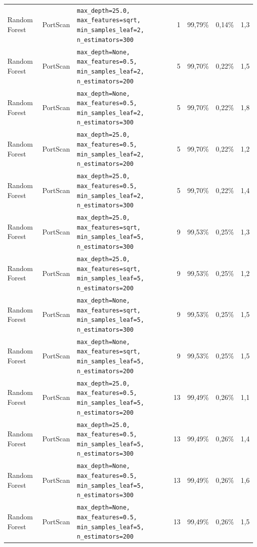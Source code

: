 {{\begin{tabularx}{\textwidth}{@{}llLrrrr@{}}
Random Forest & PortScan & \scriptsize\texttt{max\_depth=25.0, max\_features=sqrt, min\_samples\_leaf=2, n\_estimators=300} & 1 & 99,79\% & 0,14\% & 1,3\\
Random Forest & PortScan & \scriptsize\texttt{max\_depth=None, max\_features=0.5, min\_samples\_leaf=2, n\_estimators=200} & 5 & 99,70\% & 0,22\% & 1,5\\
Random Forest & PortScan & \scriptsize\texttt{max\_depth=None, max\_features=0.5, min\_samples\_leaf=2, n\_estimators=300} & 5 & 99,70\% & 0,22\% & 1,8\\
Random Forest & PortScan & \scriptsize\texttt{max\_depth=25.0, max\_features=0.5, min\_samples\_leaf=2, n\_estimators=200} & 5 & 99,70\% & 0,22\% & 1,2\\
Random Forest & PortScan & \scriptsize\texttt{max\_depth=25.0, max\_features=0.5, min\_samples\_leaf=2, n\_estimators=300} & 5 & 99,70\% & 0,22\% & 1,4\\
Random Forest & PortScan & \scriptsize\texttt{max\_depth=25.0, max\_features=sqrt, min\_samples\_leaf=5, n\_estimators=300} & 9 & 99,53\% & 0,25\% & 1,3\\
Random Forest & PortScan & \scriptsize\texttt{max\_depth=25.0, max\_features=sqrt, min\_samples\_leaf=5, n\_estimators=200} & 9 & 99,53\% & 0,25\% & 1,2\\
Random Forest & PortScan & \scriptsize\texttt{max\_depth=None, max\_features=sqrt, min\_samples\_leaf=5, n\_estimators=300} & 9 & 99,53\% & 0,25\% & 1,5\\
Random Forest & PortScan & \scriptsize\texttt{max\_depth=None, max\_features=sqrt, min\_samples\_leaf=5, n\_estimators=200} & 9 & 99,53\% & 0,25\% & 1,5\\
Random Forest & PortScan & \scriptsize\texttt{max\_depth=25.0, max\_features=0.5, min\_samples\_leaf=5, n\_estimators=200} & 13 & 99,49\% & 0,26\% & 1,1\\
Random Forest & PortScan & \scriptsize\texttt{max\_depth=25.0, max\_features=0.5, min\_samples\_leaf=5, n\_estimators=300} & 13 & 99,49\% & 0,26\% & 1,4\\
Random Forest & PortScan & \scriptsize\texttt{max\_depth=None, max\_features=0.5, min\_samples\_leaf=5, n\_estimators=300} & 13 & 99,49\% & 0,26\% & 1,6\\
Random Forest & PortScan & \scriptsize\texttt{max\_depth=None, max\_features=0.5, min\_samples\_leaf=5, n\_estimators=200} & 13 & 99,49\% & 0,26\% & 1,5\\

\end{tabularx}}}

